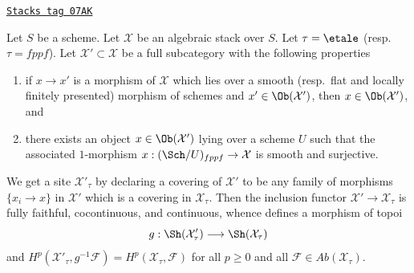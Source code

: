 \begin{lemma}
\label{stacks-sheaves-lemma-cohomology-on-subcategory}
\href{https://stacks.math.columbia.edu/tag/07AK}{\texttt{Stacks tag 07AK}}

Let $S$ be a scheme. Let $\mathcal{X}$ be an algebraic stack over $S$.
Let $\tau = \etale$ (resp.\ $\tau = fppf$). Let
$\mathcal{X}' \subset \mathcal{X}$ be a full subcategory with the
following properties
\begin{enumerate}
\item if $x \to x'$ is a morphism of $\mathcal{X}$ which lies over a
smooth (resp.\ flat and locally finitely presented) morphism of
schemes and $x' \in \Ob(\mathcal{X}')$, then $x \in \Ob(\mathcal{X}')$, and
\item there exists an object $x \in \Ob(\mathcal{X}')$ lying over
a scheme $U$ such that the associated $1$-morphism
$x : (\Sch/U)_{fppf} \to \mathcal{X}$ is smooth and surjective.
\end{enumerate}
We get a site $\mathcal{X}'_\tau$ by declaring a covering of $\mathcal{X}'$
to be any family of morphisms $\{x_i \to x\}$ in $\mathcal{X}'$ which is a
covering in $\mathcal{X}_\tau$. Then the inclusion functor
$\mathcal{X}' \to \mathcal{X}_\tau$ is fully faithful, cocontinuous, and
continuous, whence defines a morphism of topoi
$$
g : \Sh(\mathcal{X}'_\tau) \longrightarrow \Sh(\mathcal{X}_\tau)
$$
and $H^p(\mathcal{X}'_\tau, g^{-1}\mathcal{F}) =
H^p(\mathcal{X}_\tau, \mathcal{F})$ for all $p \geq 0$ and all
$\mathcal{F} \in \textit{Ab}(\mathcal{X}_\tau)$.
\end{lemma}

